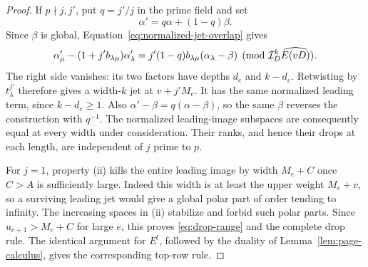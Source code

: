 \begin{proof}
If $p\nmid j,j'$, put $q=j'/j$ in the prime field and set
\[
 \alpha'=q\alpha+(1-q)\beta.
\]
Since $\beta$ is global, Equation~\eqref{eq:normalized-jet-overlap}
gives
\[
 \alpha'_\mu-(1+j'b_{\lambda\mu})\alpha'_\lambda
 =j'(1-q)b_{\lambda\mu}(\alpha_\lambda-\beta)
 \pmod{\mathcal I_D^k\widehat{E(vD)}}.
\]
The right side vanishes: its two factors have depths $d_e$ and
$k-d_e$.  Retwisting by $t_\lambda^{j'}$ therefore gives a
width-$k$ jet at $v+j'M_e$.  It has the same normalized leading
term, since $k-d_e\ge1$.  Also
$\alpha'-\beta=q(\alpha-\beta)$, so the same $\beta$ reverses
the construction with $q^{-1}$.  The normalized leading-image
subspaces are consequently equal at every width under consideration.
Their ranks, and hence their drops at each length, are independent of
$j$ prime to $p$.

For $j=1$, property (ii) kills the entire leading image by width
$M_e+C$ once $C>A$ is sufficiently large.  Indeed this width is
at least the upper weight $M_e+v$, so a surviving leading jet
would give a global polar part of order tending to infinity.
The increasing spaces in (ii) stabilize and forbid such polar
parts.  Since $u_{e+1}>M_e+C$ for large $e$, this proves
\eqref{eq:drop-range} and the complete drop rule.  The identical
argument for $E^!$, followed by the duality of
Lemma~\ref{lem:page-calculus}, gives the corresponding top-row rule.


\end{proof}
